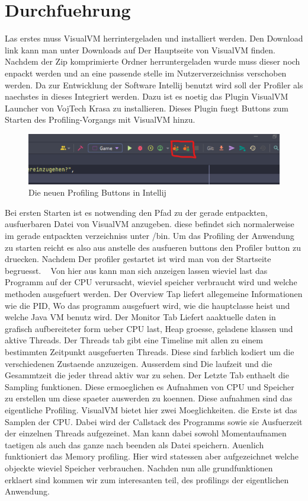\documentclass{article}
\begin{document}
\section{Durchfuehrung}
Las erstes muss VisualVM herrintergeladen und installiert werden. Den Download link kann man unter Downloads auf Der Hauptseite von VisualVM finden. Nachdem der Zip komprimierte Ordner herruntergeladen wurde muss dieser noch enpackt werden und an eine passende stelle im Nutzerverzeichniss verschoben werden. Da zur Entwicklung der Software Intellij benutzt wird soll der Profiler als naechstes in dieses Integriert werden. Dazu ist es noetig das Plugin VisualVM Launcher von VojTech Krasa zu installieren. Dieses Plugin fuegt Buttons zum Starten des Profiling-Vorgangs mit VisualVM hinzu. ~\cite{fig:Intellij_VisualVM_Button}
\begin{figure}[t]
  \centering
  \includegraphics{Intellij_VisualVM_Button}
  \caption{Die neuen Profiling Buttons in Intellij}
  \label{fig:Intellij_VisualVM_Button}
\end{figure}
Bei ersten Starten ist es notwending den Pfad zu der gerade entpackten, ausfuerbaren Datei von VisualVM anzugeben. diese befindet sich normalerweise im gerade entpackten verzeichniss unter /bin. Um das Profiling der Anwendung zu starten reicht es also aus anstelle des ausfueren buttons den Profiler button zu druecken. Nachdem Der profiler gestartet ist wird man von der Startseite begruesst. ~\cite{fig:VisualVM_MainPage} Von hier aus kann man sich anzeigen lassen wieviel last das Programm auf der CPU verursacht, wieviel speicher verbraucht wird und welche methoden ausgefuert werden. Der Overview Tap liefert allegemeine Informationen wie die PID, Wo das programm ausgefuert wird, wie die hauptclasse heist und welche Java 
VM benutz wird. Der Monitor Tab Liefert aaaktuelle daten in grafisch aufbereiteter form ueber CPU last, Heap groesse, geladene klassen und aktive Threads.
Der Threads tab gibt eine Timeline mit allen zu einem bestimmten Zeitpunkt ausgefuerten Threads. Diese sind farblich kodiert um die verschiedenen Zustaende anzuzeigen. Ausserdem sind Die laufzeit und die Gesammtzeit die jeder thread aktiv war zu sehen. Der Letzte Tab enthaelt die Sampling funktionen. Diese ermoeglichen es Aufnahmen von CPU und Speicher zu erstellen um diese spaeter auswerden zu koennen. Diese aufnahmen sind das eigentliche Profiling. VisualVM bietet hier zwei Moeglichkeiten. die Erste ist das Samplen der CPU. Dabei wird der Callstack des Programms sowie sie Ausfuerzeit der einzelnen Threads aufgezeinet. Man kann dabei sowohl Momentaufnamen taetigen als auch das ganze nach beenden als Datei speichern. Auenlich funktioniert das Memory profiling. Hier wird statessen aber aufgezeichnet welche objeckte wieviel Speicher verbrauchen. Nachden nun alle grundfunktionen erklaert sind kommen wir zum interesanten teil, des profilings der eigentlichen Anwendung.
\end{document}
